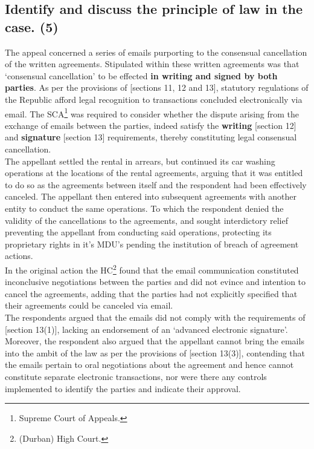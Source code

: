 \documentclass[11pt]{article}
\begin{document}
\subsection{Identify and discuss the principle of law in the case. (5)}
\label{sec:org351e88d}

The appeal concerned a series of emails purporting to the consensual
cancellation of the written agreements. Stipulated within these written
agreements was that `consensual cancellation' to be effected \textbf{in writing and
signed by both parties}. As per the provisions of [sections 11, 12 and
13]\cite{rsa02_elect_comm_trans_act}, statutory regulations of the Republic
afford legal recognition to transactions concluded electronically via email. The
SCA\footnote{Supreme Court of Appeals.} was required to consider whether the dispute
arising from the exchange of emails between the parties, indeed satisfy the
\textbf{writing} [section 12]\cite{rsa02_elect_comm_trans_act} and \textbf{signature} [section
13]\cite{rsa02_elect_comm_trans_act} requirements, thereby constituting legal
consensual cancellation.\\

The appellant settled the rental in arrears, but continued its car washing
operations at the locations of the rental agreements, arguing that it was
entitled to do so as the agreements between itself and the respondent had been
effectively canceled. The appellant then entered into subsequent agreements with
another entity to conduct the same operations. To which the respondent denied
the validity of the cancellations to the agreements, and sought interdictory
relief preventing the appellant from conducting said operations, protecting its
proprietary rights in it's MDU's pending the institution of breach of
agreement actions.\\

In the original action the HC\footnote{(Durban) High Court.} found that the email
communication constituted inconclusive negotiations between the parties and did
not evince and intention to cancel the agreements, adding that the parties had
not explicitly specified that their agreements could be canceled via email.\\

The respondents argued that the emails did not comply with the requirements of
[section 13(1)]\cite{rsa02_elect_comm_trans_act}, lacking an endorsement of an
`advanced electronic signature'. Moreover, the respondent also argued that the
appellant cannot bring the emails into the ambit of the law as per the
provisions of [section 13(3)]\cite{rsa02_elect_comm_trans_act}, contending that
the emails pertain to oral negotiations about the agreement and hence cannot
constitute separate electronic transactions, nor were there any controls
implemented to identify the parties and indicate their approval.\\
\end{document}
